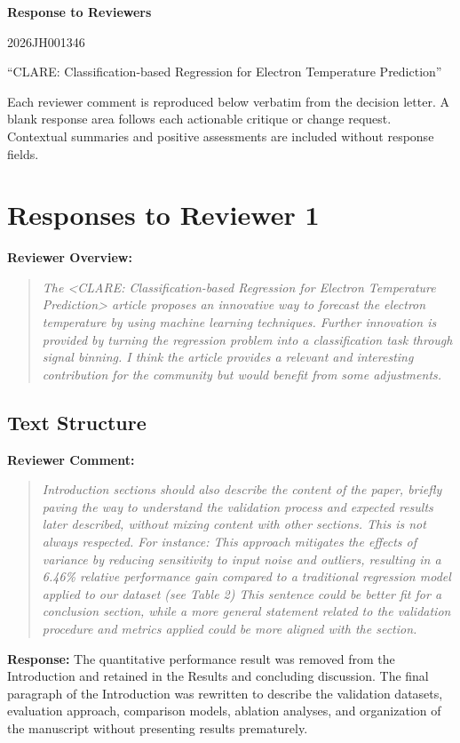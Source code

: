 \documentclass[a4paper,12pt]{article}
\newcommand{\reviewercomment}[1]{%
  \begin{samepage}%
  \par\noindent\textbf{Reviewer Comment:}\par
  \begin{quote}\itshape #1\end{quote}}
\newcommand{\reviewercontext}[1]{%
  \par\noindent\textbf{Reviewer Overview:}\par
  \begin{quote}\itshape #1\end{quote}}
\newcommand{\filledresponse}[1]{%
  \par\noindent\textbf{Response:} #1\par
  \vspace{0.4cm}%
  \end{samepage}}
\begin{document}
\begin{center}
  {\Large\bfseries Response to Reviewers}\par\vspace{0.3cm}
  {\large 2026JH001346}\par\vspace{0.15cm}
  {\large ``CLARE: Classification-based Regression for Electron Temperature Prediction''}
\end{center}

Each reviewer comment is reproduced below verbatim from the decision letter. A blank response
area follows each actionable critique or change request. Contextual summaries and positive
assessments are included without response fields.

\newpage
\section*{Responses to Reviewer 1}

\reviewercontext{The <CLARE: Classification-based Regression for Electron Temperature Prediction> article proposes an
innovative way to forecast the electron temperature by using machine learning techniques. Further
innovation is provided by turning the regression problem into a classification task through signal
binning. I think the article provides a relevant and interesting contribution for the community but
would benefit from some adjustments.}

\subsection*{Text Structure}

\reviewercomment{Introduction sections should also describe the content of the paper, briefly paving the way to
understand the validation process and expected results later described, without mixing content with
other sections. This is not always respected. For instance: This approach mitigates the effects of
variance by reducing sensitivity to input noise and outliers, resulting in a 6.46\% relative
performance gain compared to a traditional regression model applied to our dataset (see Table 2)
This sentence could be better fit for a conclusion section, while a more general statement related
to the validation procedure and metrics applied could be more aligned with the section.}
\filledresponse{The quantitative performance result was removed from the Introduction
and retained in the Results and concluding discussion. The final paragraph of the Introduction
was rewritten to describe the validation datasets, evaluation approach, comparison models,
ablation analyses, and organization of the manuscript without presenting results prematurely.}
\end{document}
